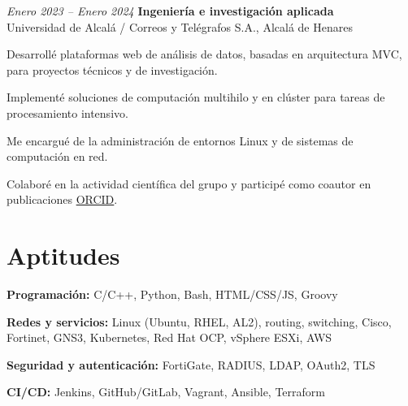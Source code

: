 \vspace{0.2 cm}

\begin{twocolentry}{\textit{Enero 2023 – Enero 2024}}
	\textbf{Ingeniería e investigación aplicada} \\
	Universidad de Alcalá / Correos y Telégrafos S.A., Alcalá de Henares
\end{twocolentry}
\begin{onecolentry}
	\begin{highlights}
		\item Desarrollé plataformas web de análisis de datos, basadas en arquitectura MVC, para proyectos técnicos y de investigación.
		\item Implementé soluciones de computación multihilo y en clúster para tareas de procesamiento intensivo.
		\item Me encargué de la administración de entornos Linux y de sistemas de computación en red.
		\item Colaboré en la actividad científica del grupo y participé como coautor en publicaciones \href{https://orcid.org/0009-0000-6862-1872}{ORCID}.
	\end{highlights}
\end{onecolentry}

\vspace{-10pt}

\section{Aptitudes}

\begin{onecolentry}
	\textbf{Programación:} C/C++, Python, Bash, HTML/CSS/JS, Groovy
\end{onecolentry}
\begin{onecolentry}
	\textbf{Redes y servicios:} Linux (Ubuntu, RHEL, AL2), routing, switching, Cisco, Fortinet, GNS3, Kubernetes, Red Hat OCP, vSphere ESXi, AWS
\end{onecolentry}
\begin{onecolentry}
	\textbf{Seguridad y autenticación:} FortiGate, RADIUS, LDAP, OAuth2, TLS
\end{onecolentry}
\begin{onecolentry}
	\textbf{CI/CD:} Jenkins, GitHub/GitLab, Vagrant, Ansible, Terraform
\end{onecolentry}